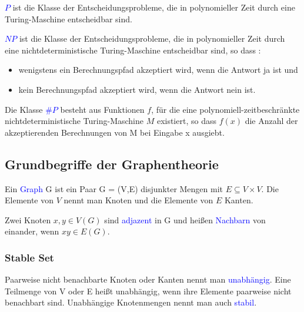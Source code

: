 \begin{definition}
\textcolor{blue}{$P$} ist die Klasse der Entscheidungsprobleme, die in polynomieller Zeit durch eine Turing-Maschine entscheidbar sind. \cite{Kompl1}
\end{definition}

\begin{definition}
\textcolor{blue}{$NP$} ist die Klasse der Entscheidungsprobleme, die in polynomieller Zeit durch eine nichtdeterministische Turing-Maschine entscheidbar sind, so dass \citep{Kompl1} :
\begin{itemize}
\item wenigstens ein Berechnungspfad akzeptiert wird, wenn die Antwort \glqq ja\grqq{}  ist und
\item kein Berechnungspfad akzeptiert wird, wenn die Antwort \glqq nein\grqq{} ist.
\end{itemize} 
\end{definition}

\begin{definition}
Die Klasse \textcolor{blue}{$\#P$} besteht aus Funktionen $f$, für die eine polynomiell-zeitbeschränkte nichtdeterministische Turing-Maschine $M$ existiert, so dass $f(x)$ die Anzahl der akzeptierenden Berechnungen von M bei Eingabe x ausgiebt. \citep{Kompl2}
\end{definition}


\subsection{Grundbegriffe der Graphentheorie} 

\begin{definition}
Ein \textcolor{blue}{Graph} G ist ein Paar G = (V,E) disjunkter Mengen mit $E \subseteq V\times V$. Die Elemente von $V$ nennt man Knoten und die Elemente von $E$ Kanten. \cite{Diestel}
\end{definition}

\begin{definition}
Zwei Knoten $x,y \in V(G)$ sind \textcolor{blue}{adjazent} in G und heißen \textcolor{blue}{Nachbarn} von einander, wenn $xy \in E(G)$. \cite{Diestel}
\end{definition}

\subsubsection*{Stable Set}

\begin{definition}
Paarweise nicht benachbarte Knoten oder Kanten nennt man \textcolor{blue}{unabhängig}. Eine Teilmenge von V oder E heißt unabhängig, wenn ihre Elemente paarweise nicht benachbart sind. Unabhängige Knotenmengen nennt man auch \textcolor{blue}{stabil}. \cite{Diestel}
\end{definition}

